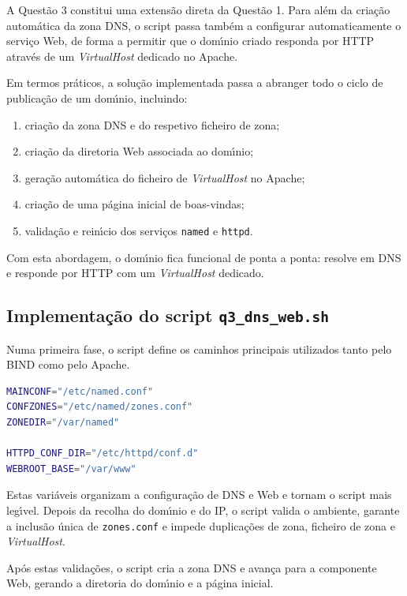 A Quest\~ao 3 constitui uma extens\~ao direta da Quest\~ao 1. Para al\'em da cria\c{c}\~ao autom\'atica da zona DNS, o script passa tamb\'em a configurar automaticamente o servi\c{c}o Web, de forma a permitir que o dom\'{\i}nio criado responda por HTTP atrav\'es de um \textit{VirtualHost} dedicado no Apache.

Em termos pr\'aticos, a solu\c{c}\~ao implementada passa a abranger todo o ciclo de publica\c{c}\~ao de um dom\'{\i}nio, incluindo:

\begin{enumerate}
    \item cria\c{c}\~ao da zona DNS e do respetivo ficheiro de zona;
    \item cria\c{c}\~ao da diretoria Web associada ao dom\'{\i}nio;
    \item gera\c{c}\~ao autom\'atica do ficheiro de \textit{VirtualHost} no Apache;
    \item cria\c{c}\~ao de uma p\'agina inicial de boas-vindas;
    \item valida\c{c}\~ao e rein\'{\i}cio dos servi\c{c}os \texttt{named} e \texttt{httpd}.
\end{enumerate}

Com esta abordagem, o dom\'{\i}nio fica funcional de ponta a ponta: resolve em DNS e responde por HTTP com um \textit{VirtualHost} dedicado.

\subsection{Implementa\c{c}\~ao do script \texttt{q3\_dns\_web.sh}}

Numa primeira fase, o script define os caminhos principais utilizados tanto pelo BIND como pelo Apache.

\begin{lstlisting}[language=bash,caption={Variaveis principais para DNS e Apache}]
MAINCONF="/etc/named.conf"
CONFZONES="/etc/named/zones.conf"
ZONEDIR="/var/named"

HTTPD_CONF_DIR="/etc/httpd/conf.d"
WEBROOT_BASE="/var/www"
\end{lstlisting}

Estas vari\'aveis organizam a configura\c{c}\~ao de DNS e Web e tornam o script mais leg\'{\i}vel. Depois da recolha do dom\'{\i}nio e do IP, o script valida o ambiente, garante a inclus\~ao \'unica de \texttt{zones.conf} e impede duplica\c{c}\~oes de zona, ficheiro de zona e \textit{VirtualHost}.

Ap\'os estas valida\c{c}\~oes, o script cria a zona DNS e avan\c{c}a para a componente Web, gerando a diretoria do dom\'{\i}nio e a p\'agina inicial.

